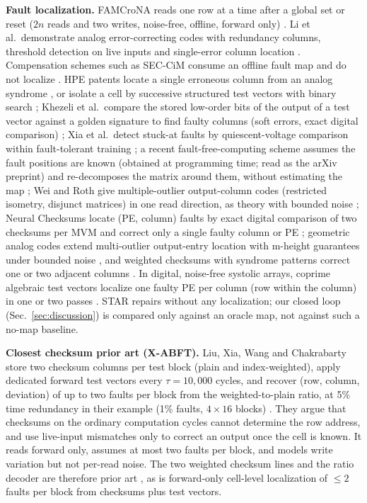 \documentclass[journal]{IEEEtran}
\begin{document}
\textbf{Fault localization.} FAMCroNA reads one row at a time after a global set or reset ($2n$ reads and two writes, noise-free, offline, forward only) \cite{yadav2022famcrona}. Li et al.\ demonstrate analog error-correcting codes with redundancy columns, threshold detection on live inputs and single-error column location \cite{li2020analogecc}. Compensation schemes such as SEC-CiM consume an offline fault map and do not localize \cite{bommana2024seccim,bommana2026seccimplus}. HPE patents locate a single erroneous column from an analog syndrome \cite{hpe11804859}, or isolate a cell
by successive structured test vectors with binary search \cite{hpe11532356}; Khezeli et al.\ compare the stored low-order bits of the output of a test vector against a golden signature to find faulty columns (soft errors, exact digital comparison) \cite{khezeli2024}; Xia et al.\ detect stuck-at faults by quiescent-voltage comparison within fault-tolerant training \cite{xia2017}; a recent fault-free-computing scheme assumes the fault positions are known (obtained at programming time; read as the arXiv preprint) and re-decomposes the matrix around them, without estimating the map \cite{xu2026fault}; Wei and Roth give multiple-outlier
output-column codes (restricted isometry, disjunct matrices) in one read direction, as theory with bounded noise \cite{weiroth2024}; Neural Checksums locate
(PE, column) faults by exact digital comparison of two checksums per MVM and correct only a single faulty column or PE \cite{neuralchecksums2024}; geometric analog codes extend multi-outlier output-entry location with m-height guarantees under bounded noise \cite{zhu2026geo}, and weighted checksums with syndrome patterns correct one or two adjacent columns \cite{pinto2024touba}. In digital, noise-free systolic arrays, coprime algebraic test vectors localize one faulty PE per column (row within the column) in one or two passes \cite{flare2026}. STAR \cite{star2026} repairs without any localization; our closed loop (Sec.~\ref{sec:discussion}) is compared only against an oracle map, not against such a no-map baseline.

\textbf{Closest checksum prior art (X-ABFT).} Liu, Xia, Wang and Chakrabarty store two checksum columns per test block (plain and index-weighted), apply dedicated forward test vectors every $\tau=10{,}000$ cycles, and recover (row, column, deviation) of up to two faults per block from the weighted-to-plain ratio, at 5\% time redundancy in their example (1\% faults, $4\times16$ blocks) \cite{liu2020xabft}. They argue that checksums on the ordinary computation cycles cannot determine the row address, and use live-input mismatches only to correct an output once the cell is known. It reads forward only, assumes at most two faults per block, and models write variation but not per-read noise. The two weighted checksum lines and the ratio decoder are therefore prior art \cite{liu2020xabft,pinto2024touba}, as is forward-only cell-level localization of $\le2$ faults per block from checksums plus test vectors.
\end{document}
